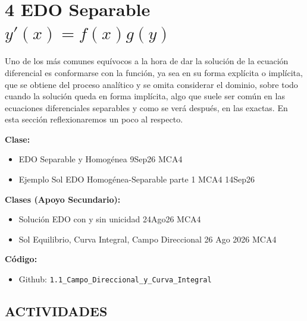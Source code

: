 \section{4 EDO Separable $y'(x)=f(x)g(y)$}

\begin{tcolorbox}[enunciado]
Uno de los más comunes equívocos a la hora de dar la solución de la ecuación diferencial es conformarse con la función, ya sea en su forma explícita o implícita, que se obtiene del proceso analítico y se omita considerar el dominio, sobre todo cuando la solución queda en forma implícita, algo que suele ser común en las ecuaciones diferenciales separables y como se verá después, en las exactas. En esta sección reflexionaremos un poco al respecto.

\vspace{0.2cm}
\textbf{Clase:}
\begin{itemize}[leftmargin=*]
    \item EDO Separable y Homogénea 9Sep26 MCA4
    \item Ejemplo Sol EDO Homogénea-Separable parte 1 MCA4 14Sep26
\end{itemize}

\textbf{Clases (Apoyo Secundario):}
\begin{itemize}[leftmargin=*]
    \item Solución EDO con y sin unicidad 24Ago26 MCA4
    \item Sol Equilibrio, Curva Integral, Campo Direccional 26 Ago 2026 MCA4
\end{itemize}

\textbf{Código:}
\begin{itemize}[leftmargin=*]
    \item Github: \texttt{1.1\_Campo\_Direccional\_y\_Curva\_Integral}
\end{itemize}
\end{tcolorbox}

\subsection*{ACTIVIDADES}

